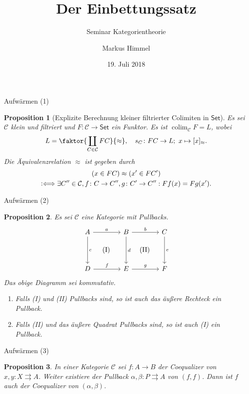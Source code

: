 \documentclass[usenames, dvipsnames]{beamer}
\title{Der Einbettungssatz}
\subtitle{Seminar Kategorientheorie}
\author{Markus Himmel}
\date{19. Juli 2018}
\newtheorem{proposition}{Proposition}
\newcommand{\defiff}{\mathrel{\vcentcolon\Longleftrightarrow}}
\newcommand\ccat\mathsf
\newcommand\cat\mathcal
\newcommand{\n}{\pgfmatrixnextcell}
\DeclareMathOperator{\colim}{colim}
\begin{document}
	\begin{frame}
		\maketitle
	\end{frame}
	\begin{frame}{Aufwärmen (1)}
		\begin{proposition}[Explizite Berechnung kleiner filtrierter Colimiten in $\ccat{Set}$]\label{2-13-3}
			Es sei $\cat{C}$ klein und filtriert und $F\colon \cat{C}\to\ccat{Set}$ ein
			Funktor. Es ist $\colim_\cat{C} F = L$, wobei
			\[
				L=\faktor{\coprod_{C\in\cat{C}}FC}{\approx},\quad s_C\colon FC\to L;\ x\mapsto [x]_\approx.
			\]
			Die Äquivalenzrelation $\approx$ ist gegeben durch
			\begin{multline*}
				(x\in FC) \approx (x'\in FC')\\
					\defiff \exists C''\in\cat{C}, f\colon C\to C'', g\colon C'\to C'': Ff(x) = Fg(x').
			\end{multline*}
		\end{proposition}
	\end{frame}
	\begin{frame}{Aufwärmen (2)}
		\begin{proposition}
			Es sei $\cat{C}$ eine Kategorie mit Pullbacks.
			\[
				\begin{tikzcd}[sep=4em]
					A \ar{r}{a} \ar[phantom]{dr}{\text{(I)}} \ar{d}{c} \n B \ar[phantom]{dr}{\text{(II)}} \ar{r}{b} \ar{d}{d} \n C \ar{d}{e}\\
					D \ar{r}{f} \n E \ar{r}{g} \n F
				\end{tikzcd}
			\]
			Das obige Diagramm sei kommutativ.
			\begin{enumerate}
				\item Falls (I) und (II) Pullbacks sind, so ist auch das äußere
					Rechteck ein Pullback.
				\item Falls (II) und das äußere Quadrat Pullbacks sind, so ist auch
					(I) ein Pullback.
			\end{enumerate}
		\end{proposition}
	\end{frame}
	\begin{frame}{Aufwärmen (3)}
		\begin{proposition}
			In einer Kategorie $\cat{C}$ sei $f\colon A\to B$ der Coequalizer von
			$x, y\colon X\rightrightarrows A$. Weiter existiere der Pullback
			$\alpha, \beta\colon P\rightrightarrows A$ von $(f, f)$. Dann ist
			$f$ auch der Coequalizer von $(\alpha, \beta)$.
		\end{proposition}
	\end{frame}
\end{document}
